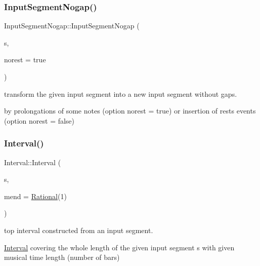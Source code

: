 \subsubsection{\texorpdfstring{InputSegmentNogap()}{InputSegmentNogap()}}
{\footnotesize\ttfamily Input\+Segment\+Nogap\+::\+Input\+Segment\+Nogap (\begin{DoxyParamCaption}\item[{const \mbox{\hyperlink{classInputSegment}{Input\+Segment}} \&}]{s,  }\item[{bool}]{norest = {\ttfamily true} }\end{DoxyParamCaption})}



transform the given input segment into a new input segment without gaps. 

by prolongations of some notes (option norest = true) or insertion of rests events (option norest = false) \mbox{\label{group__segment_gadfaf31fca3f5e5da49e37c7baa275125}} 
\subsubsection{\texorpdfstring{Interval()}{Interval()}\hspace{0.1cm}{\footnotesize\ttfamily [1/2]}}
{\footnotesize\ttfamily Interval\+::\+Interval (\begin{DoxyParamCaption}\item[{const \mbox{\hyperlink{classInputSegment}{Input\+Segment}} $\ast$}]{s,  }\item[{\mbox{\hyperlink{classRational}{Rational}}}]{mend = {\ttfamily \mbox{\hyperlink{classRational}{Rational}}(1)} }\end{DoxyParamCaption})}



top interval constructed from an input segment. 

\mbox{\hyperlink{classInterval}{Interval}} covering the whole length of the given input segment s with given musical time length (number of bars) \mbox{\label{group__segment_gaefc21b7c838661c05286304f6d891690}} 
